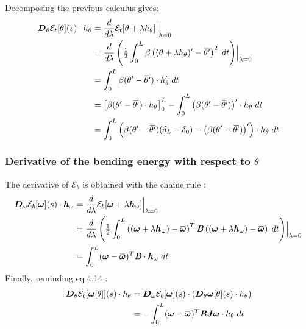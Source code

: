 Decomposing the previous calculus gives:
\begin{equation}
	\begin{aligned}
	\pdiffof{\theta}{\mathcal{E}_t[\theta]}{s}{h_\theta}
		&= \frac{d}{d\lambda} \mathcal{E}_t[\theta + \lambda h_\theta]\Bigr|_{\lambda = 0} \\
		&= \frac{d}{d\lambda}\left( \tfrac{1}{2} \int_{0}^{L} \beta\left((\theta + \lambda h_\theta)' -{\overbar{\theta'}}\right)^2 \;dt \right)\Bigr|_{\lambda = 0} \\
		&= \int_{0}^{L} \beta(\theta' -{\overbar{\theta'}}) \cdot h_\theta' \;dt \\
		&= \left[\beta(\theta' -{\overbar{\theta'}}) \cdot h_\theta\right]_0^L - \int_{0}^{L} \left(\beta(\theta' -{\overbar{\theta'}})\right)' \cdot h_\theta \;dt \\
		&= \int_{0}^{L} \left(\beta(\theta' -{\overbar{\theta'}})(\delta_L-\delta_0) - \left(\beta(\theta' -{\overbar{\theta'}})\right)'\right) \cdot h_\theta \;dt \\
	\end{aligned}
\end{equation}

\subsubsection{Derivative of the bending energy with respect to $\theta$}

The derivative of $\mathcal{E}_b$ is obtained with the chaine rule :
\begin{equation}
	\begin{aligned}
	\pdiffof{\omega}{\mathcal{E}_b[\vect{\omega}]}{s}{\vect{h}_\omega}
		&= \frac{d}{d\lambda} \mathcal{E}_b[\vect{\omega} + \lambda \vect{h}_\omega]\Bigr|_{\lambda = 0} \\
		&= \frac{d}{d\lambda}\left( \tfrac{1}{2} \int_{0}^{L} \left((\vect{\omega} + \lambda \vect{h}_\omega)-\overbar{\vect{\omega}}\right)^T \mat{B} \left((\vect{\omega} + \lambda \vect{h}_\omega)-\overbar{\vect{\omega}}\right) \;dt \right)\Bigr|_{\lambda = 0} \\
		&= \int_{0}^{L} (\vect{\omega} - \overbar{\vect{\omega}})^T \mat{B} \cdot \vect{h}_\omega \;dt \\
	\end{aligned}
\end{equation}
Finally, reminding eq 4.14 :
\begin{equation}
	\begin{aligned}
	\pdiffof{\theta}{\mathcal{E}_b[\vect{\omega}[\theta]]}{s}{h_\theta} &=
	\pdiffof{\omega}{\mathcal{E}_b[\vect{\omega}]}{s}{(\pdiffof{\theta}{\vect{\omega}[\theta]}{s}{h_\theta})} \\
	&= - \int_{0}^{L} (\vect{\omega} - \overbar{\vect{\omega}})^T \mat{B} \mat{J}\vect{\omega}\cdot h_\theta \;dt
	\end{aligned}
\end{equation}

